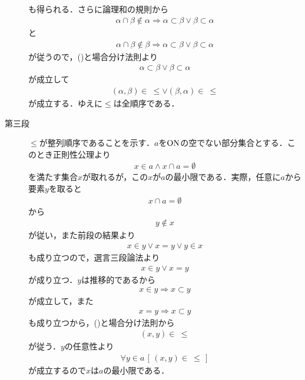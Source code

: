 \begin{prf}
\begin{description}
\begin{align}
				\end{align}
				も得られる．さらに論理和の規則から
				\begin{align}
					\alpha \cap \beta \notin \alpha \Longrightarrow \alpha \subset \beta \vee \beta \subset \alpha
				\end{align}
				と
				\begin{align}
					\alpha \cap \beta \notin \beta \Longrightarrow \alpha \subset \beta \vee \beta \subset \alpha
				\end{align}
				が従うので，()と場合分け法則より
				\begin{align}
					\alpha \subset \beta \vee \beta \subset \alpha
				\end{align}
				が成立して
				\begin{align}
					(\alpha,\beta) \in\ \leq \vee (\beta,\alpha) \in\ \leq
				\end{align}
				が成立する．ゆえに$\leq$は全順序である．
			
			\item[第三段]
				$\leq$が整列順序であることを示す．$a$を$\mathrm{ON}$の空でない部分集合とする．このとき正則性公理より
				\begin{align}
					x \in a \wedge x \cap a = \emptyset
				\end{align}
				を満たす集合$x$が取れるが，この$x$が$a$の最小限である．実際，任意に$a$から要素$y$を取ると
				\begin{align}
					x \cap a = \emptyset
				\end{align}
				から
				\begin{align}
					y \notin x
				\end{align}
				が従い，また前段の結果より
				\begin{align}
					x \in y \vee x = y \vee y \in x
				\end{align}
				も成り立つので，選言三段論法より
				\begin{align}
					x \in y \vee x = y
					\label{eq:thm_On_is_wellordered_6}
				\end{align}
				が成り立つ．$y$は推移的であるから
				\begin{align}
					x \in y \Longrightarrow x \subset y
				\end{align}
				が成立して，また
				\begin{align}
					x = y \Longrightarrow x \subset y
				\end{align}
				も成り立つから，()と場合分け法則から
				\begin{align}
					(x,y) \in\ \leq
				\end{align}
				が従う．$y$の任意性より
				\begin{align}
					\forall y \in a\, \left[\, (x,y) \in\ \leq\, \right]
				\end{align}
				が成立するので$x$は$a$の最小限である．
				\QED
		\end{description}
	\end{prf}
	
